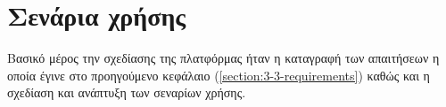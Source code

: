 \section{Σενάρια χρήσης} \label{section:3-4-use-cases}

Βασικό μέρος την σχεδίασης της πλατφόρμας ήταν η καταγραφή των απαιτήσεων η οποία έγινε στο προηγούμενο κεφάλαιο (\ref{section:3-3-requirements}) καθώς και η σχεδίαση και ανάπτυξη των σεναρίων χρήσης.

